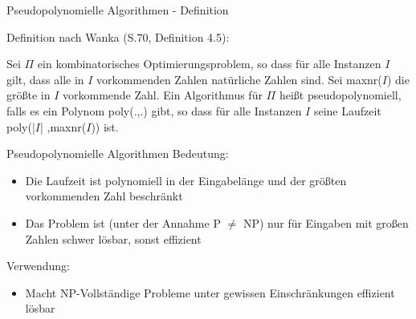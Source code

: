 \begin{frame}{Pseudopolynomielle Algorithmen - Definition}

Definition nach Wanka (S.70, Definition 4.5): \newline

Sei $\Pi$ ein kombinatorisches Optimierungsproblem, so dass für alle Instanzen $I$ gilt, dass alle in $I$ vorkommenden Zahlen natürliche Zahlen sind. Sei maxnr($I$) die größte in $I$ vorkommende Zahl. Ein Algorithmus für $\Pi$ heißt pseudopolynomiell, falls es ein Polynom poly(.,.)  gibt, so 
dass für alle Instanzen $I$ seine Laufzeit poly(|$I$| ,maxnr($I$)) ist. 

\end{frame}
\begin{frame}{Pseudopolynomielle Algorithmen}
Bedeutung:

\begin{itemize}
	\item Die Laufzeit ist polynomiell in der Eingabelänge und der größten vorkommenden Zahl beschränkt
	\item Das Problem ist (unter der Annahme P $\neq$ NP) nur für Eingaben mit großen Zahlen schwer lösbar, sonst effizient
\end{itemize}

Verwendung:
\begin{itemize}
	\item Macht NP-Vollständige Probleme unter gewissen Einschränkungen effizient lösbar
\end{itemize}
\end{frame}
